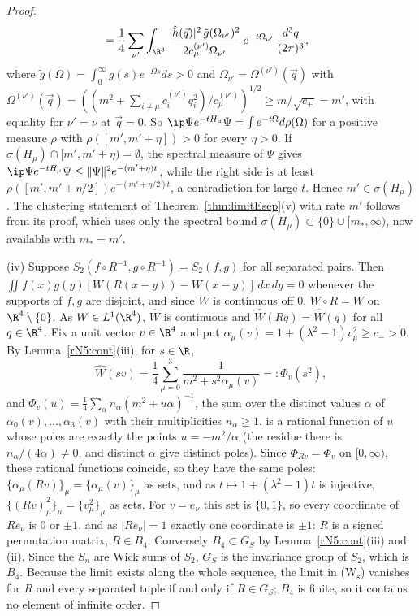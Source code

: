 \begin{proof}
\[\begin{split}
&=\frac14\sum_{\nu'}\int_{\R^3}\frac{|\hat h(\vec q)|^2\,
\tilde g(\Omega_{\nu'})^2}{2c^{(\nu')}_\mu\Omega_{\nu'}}\,
e^{-t\Omega_{\nu'}}\,\frac{d^3q}{(2\pi)^3},
\end{split}
\]
where $\tilde g(\Omega)=\int_0^\infty g(s)e^{-\Omega s}ds>0$ and
$\Omega_{\nu'}=\Omega^{(\nu')}(\vec q)$ with $\Omega^{(\nu')}(\vec q)=((m^2+\sum_{i\ne\mu}c^{(\nu')}_iq_i^2)/c^{(\nu')}_\mu
)^{1/2}\ge m/\sqrt{c_+}=m'$, with equality for $\nu'=\nu$ at $\vec q=0$. So
$\ip\Psi{e^{-tH_\mu}\Psi}=\int e^{-t\Omega}d\rho(\Omega)$ for a positive
measure $\rho$ with $\rho([m',m'+\eta])>0$ for every $\eta>0$. If $\sigma(H_\mu)
\cap[m',m'+\eta)=\emptyset$, the spectral measure of $\Psi$ gives $\ip\Psi
{e^{-tH_\mu}\Psi}\le\|\Psi\|^2e^{-(m'+\eta)t}$, while the right side is at
least $\rho([m',m'+\eta/2])e^{-(m'+\eta/2)t}$, a contradiction for large
$t$. Hence $m'\in\sigma(H_\mu)$. The clustering statement of
Theorem~\ref{thm:limitEsep}(v) with rate $m'$ follows from its proof, which
uses only the spectral bound $\sigma(H_\mu)\subset\{0\}\cup[m_*,\infty)$, now
available with $m_*=m'$.

(iv) Suppose $S_2(f\circ R^{-1},g\circ R^{-1})=S_2(f,g)$ for all separated
pairs. Then $\iint f(x)g(y)[W(R(x-y))-W(x-y)]\,dx\,dy=0$ whenever the supports
of $f,g$ are disjoint, and since $W$ is continuous off $0$, $W\circ R=W$ on
$\R^4\setminus\{0\}$. As $W\in L^1(\R^4)$, $\hat W$ is continuous and $\hat W
(Rq)=\hat W(q)$ for all $q\in\R^4$. Fix a unit vector $v\in\R^4$ and put
$\alpha_\mu(v)=1+(\lambda^2-1)v_\mu^2\ge c_->0$. By Lemma~\ref{rN5:cont}(iii),
for $s\in\R$,
\[
\hat W(sv)=\frac14\sum_{\mu=0}^3\frac1{m^2+s^2\alpha_\mu(v)}=:\Phi_v(s^2),
\]
and $\Phi_v(u)=\frac14\sum_{\alpha}n_\alpha(m^2+u\alpha)^{-1}$, the sum over
the distinct values $\alpha$ of $\alpha_0(v),\dots,\alpha_3(v)$ with their
multiplicities $n_\alpha\ge1$, is a rational function of $u$ whose poles are
exactly the points $u=-m^2/\alpha$ (the residue there is $n_\alpha/(4\alpha)
\ne0$, and distinct $\alpha$ give distinct poles). Since $\Phi_{Rv}=\Phi_v$ on
$[0,\infty)$, these rational functions coincide, so they have the same poles:
$\{\alpha_\mu(Rv)\}_\mu=\{\alpha_\mu(v)\}_\mu$ as sets, and as $t\mapsto1+(
\lambda^2-1)t$ is injective, $\{(Rv)_\mu^2\}_\mu=\{v_\mu^2\}_\mu$ as sets. For
$v=e_\nu$ this set is $\{0,1\}$, so every coordinate of $Re_\nu$ is $0$ or
$\pm1$, and as $|Re_\nu|=1$ exactly one coordinate is $\pm1$: $R$ is a
signed permutation matrix, $R\in B_4$. Conversely $B_4\subset G_S$ by
Lemma~\ref{rN5:cont}(iii) and (ii). Since the $S_n$ are Wick sums of $S_2$,
$G_S$ is the invariance group of $S_2$, which is $B_4$. Because the limit
exists along the whole sequence, the limit in (W$_{\mathrm s}$) vanishes for
$R$ and every separated tuple if and only if $R\in G_S$; $B_4$ is finite,
so it contains no element of infinite order.
\end{proof}
